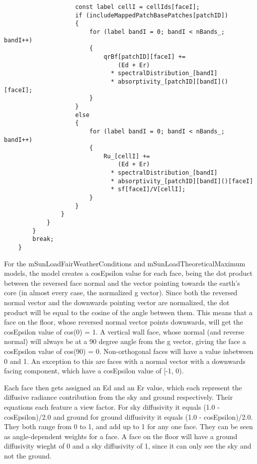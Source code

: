 \begin{verbatim}
                    const label cellI = cellIds[faceI];
                    if (includeMappedPatchBasePatches[patchID])
                    {
                        for (label bandI = 0; bandI < nBands_; bandI++)
                        {
                            qrBf[patchID][faceI] +=
                                (Ed + Er)
                              * spectralDistribution_[bandI]
                              * absorptivity_[patchID][bandI]()[faceI];
                        }
                    }
                    else
                    {
                        for (label bandI = 0; bandI < nBands_; bandI++)
                        {
                            Ru_[cellI] +=
                                (Ed + Er)
                              * spectralDistribution_[bandI]
                              * absorptivity_[patchID][bandI]()[faceI]
                              * sf[faceI]/V[cellI];
                        }
                    }
                }
            }
        }
        break;
    }
\end{verbatim}

For the mSunLoadFairWeatherConditions and mSunLoadTheoreticalMaximum models, the model creates a cosEpsilon value for each face, being the dot product between the reversed face normal and the vector pointing towards the earth's core (in almost every case, the normalized g vector). Since both the reversed normal vector and the downwards pointing vector are normalized, the dot product will be equal to the cosine of the angle between them. This means that a face on the floor, whose reversed normal vector points downwards, will get the cosEpsilon value of cos(0) = 1. A vertical wall face, whose normal (and reverse normal) will always be at a 90 degree angle from the g vector, giving the face a cosEpsilon value of cos(90) = 0. Non-orthogonal faces will have a value inbetween 0 and 1. An exception to this are faces with a normal vector with a downwards facing component, which have a cosEpsilon value of [-1, 0).

Each face then gets assigned an Ed and an Er value, which each represent the diffusive radiance contribution from the sky and ground respectively. Their equations each feature a view factor. For sky diffusivity it equals (1.0 - cosEpsilon)/2.0 and ground for ground diffusivity it equals (1.0 - cosEpsilon)/2.0. They both range from 0 to 1, and add up to 1 for any one face. They can be seen as angle-dependent weights for a face. A face on the floor will have a ground diffusivity wieght of 0 and a sky diffusivity of 1, since it can only see the sky and not the ground.

